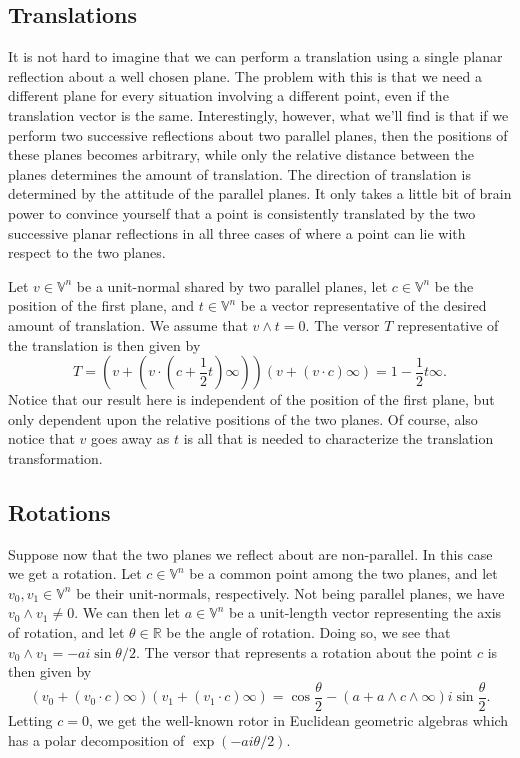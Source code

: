 \documentclass[12pt]{article}
\newcommand{\V}{\mathbb{V}}
\newcommand{\R}{\mathbb{R}}
\newcommand{\nvai}{\infty}
\begin{document}
\subsection{Translations}\label{sec_translation_versors}

It is not hard to imagine that we can perform a translation
using a single planar reflection about a well chosen plane.
The problem with this is that we need a different plane for
every situation involving a different point, even if the translation
vector is the same.  Interestingly, however, what we'll find is that
if we perform two successive reflections about two parallel planes, then
the positions of these planes becomes arbitrary, while only the relative
distance between the planes determines the amount of translation.
The direction of translation is determined by the attitude of the parallel planes.
It only takes a little bit of brain power to convince yourself that a point is consistently
translated by the two successive planar reflections in all three cases of where
a point can lie with respect to the two planes.

Let $v\in\V^n$ be a unit-normal shared by two parallel planes, let
$c\in\V^n$ be the position of the first plane, and $t\in\V^n$
be a vector representative of the desired amount of translation.
We assume that $v\wedge t=0$.
The versor $T$ representative of the translation is then given by
\begin{equation*}
T = (v+(v\cdot\left(c+\frac{1}{2}t\right)\nvai))(v+(v\cdot c)\nvai) = 1 - \frac{1}{2}t\nvai.
\end{equation*}
Notice that our result here is independent of the position of the
first plane, but only dependent upon the relative positions of
the two planes.
Of course, also notice that $v$ goes away as $t$ is all that
is needed to characterize the translation transformation.


\subsection{Rotations}

Suppose now that the two planes we reflect about are
non-parallel.  In this case we get a rotation.  Let $c\in\V^n$
be a common point among the two planes, and let $v_0,v_1\in\V^n$
be their unit-normals, respectively.  Not being parallel planes,
we have $v_0\wedge v_1\neq 0$.  We can then let $a\in\V^n$
be a unit-length vector representing the axis of rotation, and
let $\theta\in\R$ be the angle of rotation.  Doing so, we see
that $v_0\wedge v_1=-ai\sin\theta/2$.  The versor that
represents a rotation about the point $c$ is then given by
\begin{equation*}
(v_0+(v_0\cdot c)\nvai)(v_1+(v_1\cdot c)\nvai) = \cos\frac{\theta}{2} - (a+a\wedge c\wedge\nvai)i\sin\frac{\theta}{2}.
\end{equation*}
Letting $c=0$, we get the well-known rotor in Euclidean geometric algebras which
has a polar decomposition of $\exp(-ai\theta/2)$.
\end{document}

